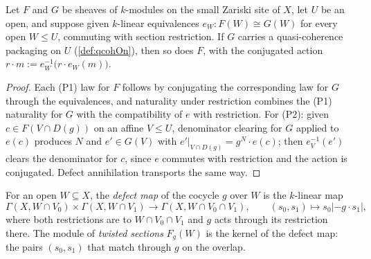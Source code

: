 \begin{definition}
  \label{def:qcohOn_transport}
  \leanok
  Let \(F\) and \(G\) be sheaves of \(k\)-modules on the small Zariski site of \(X\), let
  \(U\) be an open, and suppose given \(k\)-linear equivalences
  \(e_W : F(W) \cong G(W)\) for every open \(W \le U\), commuting with section
  restriction. If \(G\) carries a quasi-coherence packaging on \(U\)
  (\ref{def:qcohOn}), then so does \(F\), with the conjugated action
  \(r \cdot m := e_W^{-1}\bigl(r \cdot e_W(m)\bigr)\).
\end{definition}
\begin{proof}
  \leanok
  Each (P1) law for \(F\) follows by conjugating the corresponding law for \(G\) through
  the equivalences, and naturality under restriction combines the (P1) naturality for
  \(G\) with the compatibility of \(e\) with restriction. For (P2): given
  \(c \in F(V \cap D(g))\) on an affine \(V \le U\), denominator clearing for \(G\)
  applied to \(e(c)\) produces \(N\) and \(e' \in G(V)\) with
  \(e'|_{V \cap D(g)} = g^N \cdot e(c)\); then \(e_V^{-1}(e')\) clears the denominator
  for \(c\), since \(e\) commutes with restriction and the action is conjugated. Defect
  annihilation transports the same way.
\end{proof}

\begin{definition}
  \label{def:twistSections}
  \leanok
  For an open \(W \subseteq X\), the \emph{defect map} of the cocycle \(g\) over \(W\) is
  the \(k\)-linear map
  \[
    \Gamma(X, W \cap V_0) \times \Gamma(X, W \cap V_1) \longrightarrow
      \Gamma(X, W \cap V_0 \cap V_1), \qquad
    (s_0, s_1) \longmapsto s_0| - g \cdot s_1|,
  \]
  where both restrictions are to \(W \cap V_0 \cap V_1\) and \(g\) acts through its
  restriction there. The module of \emph{twisted sections} \(F_g(W)\) is the kernel of
  the defect map: the pairs \((s_0, s_1)\) that match through \(g\) on the overlap.
\end{definition}

